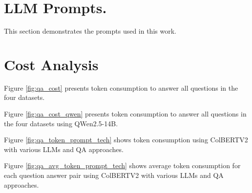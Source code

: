 \cleardoublepage
\chapter{LLM Prompts.}
\label{ch:appendices}

This section demonstrates the prompts used in this work.








\chapter{Cost Analysis}

\noindent Figure \ref{fig:qa_cost} presents token consumption to answer all questions in the four datasets.



\noindent Figure \ref{fig:qa_cost_qwen} presents token consumption to answer all questions in the four datasets using QWen2.5-14B.



\noindent Figure \ref{fig:qa_token_prompt_tech} shows token consumption using ColBERTV2 with various LLMs and QA approaches.



\noindent Figure \ref{fig:qa_avg_token_prompt_tech} shows average token consumption for each question answer pair using ColBERTV2 with various LLMs and QA approaches.


